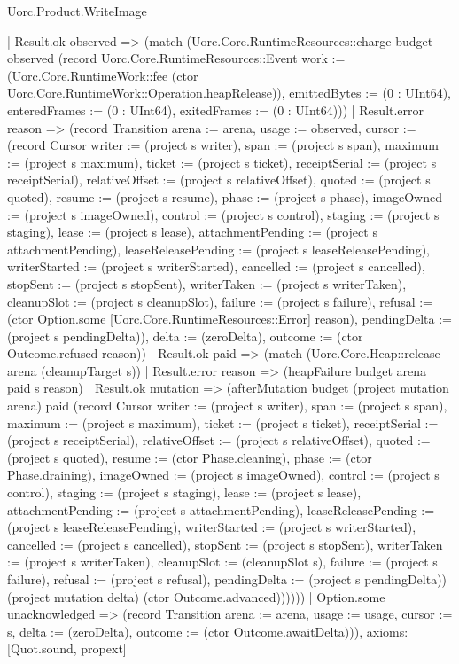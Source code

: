 \begin{lexlean}{Uorc.Product.WriteImage}
\begin{semanticmodule}
{        | Result.ok observed => (match (Uorc.Core.RuntimeResources::charge budget observed (record Uorc.Core.RuntimeResources::Event {work := (Uorc.Core.RuntimeWork::fee (ctor Uorc.Core.RuntimeWork::Operation.heapRelease)), emittedBytes := (0 : UInt64), enteredFrames := (0 : UInt64), exitedFrames := (0 : UInt64)}))
          | Result.error reason => (record Transition {arena := arena, usage := observed, cursor := (record Cursor {writer := (project s writer), span := (project s span), maximum := (project s maximum), ticket := (project s ticket), receiptSerial := (project s receiptSerial), relativeOffset := (project s relativeOffset), quoted := (project s quoted), resume := (project s resume), phase := (project s phase), imageOwned := (project s imageOwned), control := (project s control), staging := (project s staging), lease := (project s lease), attachmentPending := (project s attachmentPending), leaseReleasePending := (project s leaseReleasePending), writerStarted := (project s writerStarted), cancelled := (project s cancelled), stopSent := (project s stopSent), writerTaken := (project s writerTaken), cleanupSlot := (project s cleanupSlot), failure := (project s failure), refusal := (ctor Option.some [Uorc.Core.RuntimeResources::Error] reason), pendingDelta := (project s pendingDelta)}), delta := (zeroDelta), outcome := (ctor Outcome.refused reason)})
          | Result.ok paid => (match (Uorc.Core.Heap::release arena (cleanupTarget s))
            | Result.error reason => (heapFailure budget arena paid s reason)
            | Result.ok mutation => (afterMutation budget (project mutation arena) paid (record Cursor {writer := (project s writer), span := (project s span), maximum := (project s maximum), ticket := (project s ticket), receiptSerial := (project s receiptSerial), relativeOffset := (project s relativeOffset), quoted := (project s quoted), resume := (ctor Phase.cleaning), phase := (ctor Phase.draining), imageOwned := (project s imageOwned), control := (project s control), staging := (project s staging), lease := (project s lease), attachmentPending := (project s attachmentPending), leaseReleasePending := (project s leaseReleasePending), writerStarted := (project s writerStarted), cancelled := (project s cancelled), stopSent := (project s stopSent), writerTaken := (project s writerTaken), cleanupSlot := (cleanupSlot s), failure := (project s failure), refusal := (project s refusal), pendingDelta := (project s pendingDelta)}) (project mutation delta) (ctor Outcome.advanced))))))
    | Option.some unacknowledged => (record Transition {arena := arena, usage := usage, cursor := s, delta := (zeroDelta), outcome := (ctor Outcome.awaitDelta)})),
  axioms: [Quot.sound, propext]
}


\end{semanticmodule}
\end{lexlean}
